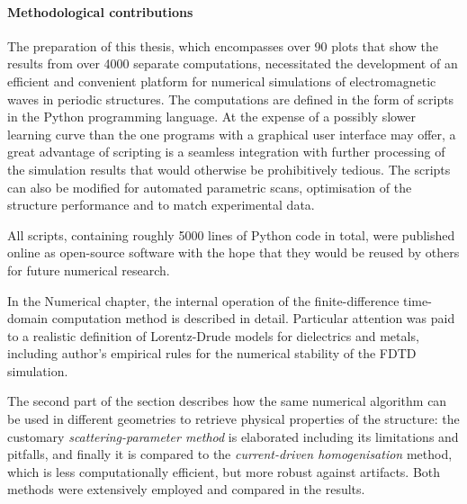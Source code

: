 \paragraph{Methodological contributions}
The preparation of this thesis, which encompasses over 90 plots that show the results from over 4000 separate computations, necessitated the development of an efficient and convenient platform for numerical simulations of electromagnetic waves in periodic structures.
The computations are defined in the form of scripts in the Python programming language. At the expense of a possibly slower learning curve than the one programs with a graphical user interface may offer, a great advantage of scripting is a seamless integration with further processing of the simulation results that would otherwise be prohibitively tedious. The scripts can also be modified for automated parametric scans, optimisation of the structure performance and to match experimental data.

All scripts, containing roughly 5000 lines of Python code in total, were published online as open-source software \cite{dominec2014_meep_metamaterials} with the hope that they would be reused by others for future numerical research.

In the Numerical chapter, the internal operation of the finite-difference time-domain computation method is described in detail. Particular attention was paid to a realistic definition of Lorentz-Drude models for dielectrics and metals, including author's empirical rules for the numerical stability of the FDTD simulation. 


The second part of the section describes how the same numerical algorithm can be used in different geometries to retrieve physical properties of the structure: the customary \textit{scattering-parameter method} is elaborated including its limitations and pitfalls, and finally it is compared to the \textit{current-driven homogenisation} method, which is less computationally efficient, but more robust against artifacts. Both methods were extensively employed and compared in the results.


